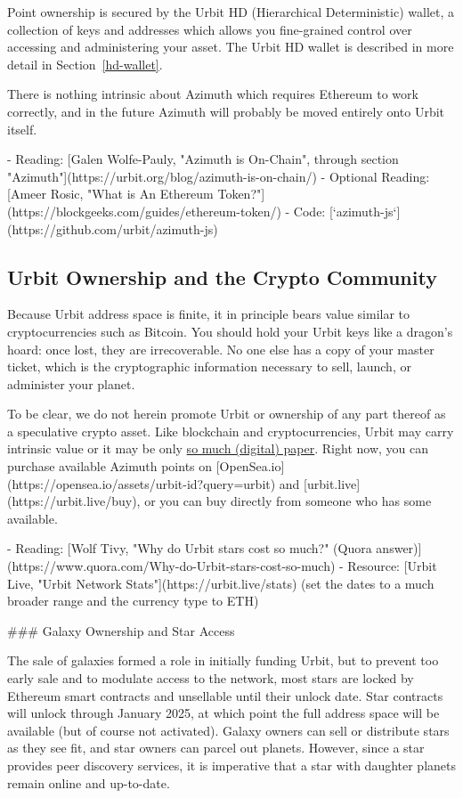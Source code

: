 {{{Point ownership is secured by the Urbit HD (Hierarchical Deterministic) wallet, a collection of keys and addresses which allows you fine-grained control over accessing and administering your asset.  The Urbit HD wallet is described in more detail in Section~\ref{hd-wallet}.

There is nothing intrinsic about Azimuth which requires Ethereum to work correctly, and in the future Azimuth will probably be moved entirely onto Urbit itself.

- Reading: [Galen Wolfe-Pauly, "Azimuth is On-Chain", through section "Azimuth"](https://urbit.org/blog/azimuth-is-on-chain/)
- Optional Reading: [Ameer Rosic, "What is An Ethereum Token?"](https://blockgeeks.com/guides/ethereum-token/)
- Code: [`azimuth-js`](https://github.com/urbit/azimuth-js)


\subsection{Urbit Ownership and the Crypto Community}

Because Urbit address space is finite, it in principle bears value similar to cryptocurrencies such as Bitcoin.  You should hold your Urbit keys like a dragon's hoard:  once lost, they are irrecoverable.  No one else has a copy of your master ticket, which is the cryptographic information necessary to sell, launch, or administer your planet.

To be clear, we do not herein promote Urbit or ownership of any part thereof as a speculative crypto asset.  Like blockchain and cryptocurrencies, Urbit may carry intrinsic value or it may be only \href{https://en.wikipedia.org/wiki/Wildcat_banking}{so much (digital) paper}.  Right now, you can purchase available Azimuth points on [OpenSea.io](https://opensea.io/assets/urbit-id?query=urbit) and [urbit.live](https://urbit.live/buy), or you can buy directly from someone who has some available.

- Reading: [Wolf Tivy, "Why do Urbit stars cost so much?" (Quora answer)](https://www.quora.com/Why-do-Urbit-stars-cost-so-much)
- Resource: [Urbit Live, "Urbit Network Stats"](https://urbit.live/stats) (set the dates to a much broader range and the currency type to ETH)


### Galaxy Ownership and Star Access

The sale of galaxies formed a role in initially funding Urbit, but to prevent too early sale and to modulate access to the network, most stars are locked by Ethereum smart contracts and unsellable until their unlock date.  Star contracts will unlock through January 2025, at which point the full address space will be available (but of course not activated).  Galaxy owners can sell or distribute stars as they see fit, and star owners can parcel out planets.  However, since a star provides peer discovery services, it is imperative that a star with daughter planets remain online and up-to-date.

}}}
